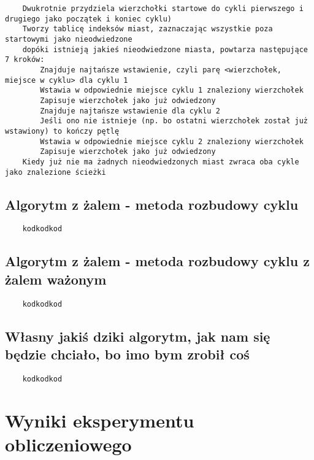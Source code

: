 \documentclass[11pt]{article}
\begin{document}
\begin{verbatim}
    Dwukrotnie przydziela wierzchołki startowe do cykli pierwszego i drugiego jako początek i koniec cyklu)
    Tworzy tablicę indeksów miast, zaznaczając wszystkie poza startowymi jako nieodwiedzone
    dopóki istnieją jakieś nieodwiedzone miasta, powtarza następujące 7 kroków:
        Znajduje najtańsze wstawienie, czyli parę <wierzchołek, miejsce w cyklu> dla cyklu 1
        Wstawia w odpowiednie miejsce cyklu 1 znaleziony wierzchołek
        Zapisuje wierzchołek jako już odwiedzony
        Znajduje najtańsze wstawienie dla cyklu 2
        Jeśli ono nie istnieje (np. bo ostatni wierzchołek został już wstawiony) to kończy pętlę
        Wstawia w odpowiednie miejsce cyklu 2 znaleziony wierzchołek
        Zapisuje wierzchołek jako już odwiedzony
    Kiedy już nie ma żadnych nieodwiedzonych miast zwraca oba cykle jako znalezione ścieżki

\end{verbatim}

\subsection{Algorytm z żalem - metoda rozbudowy cyklu}\label{subsec:algorytm-z-zalem---metoda-rozbudowy-cyklu}

\begin{verbatim}
    kodkodkod
\end{verbatim}

\subsection{Algorytm z żalem - metoda rozbudowy cyklu z żalem ważonym}\label{subsec:algorytm-z-zalem---metoda-rozbudowy-cyklu-z-zalem-wazonym}

\begin{verbatim}
    kodkodkod
\end{verbatim}

\subsection{Własny jakiś dziki algorytm, jak nam się będzie chciało, bo imo bym zrobił coś}

\begin{verbatim}
    kodkodkod
\end{verbatim}


\section{Wyniki eksperymentu obliczeniowego}\label{sec:wyniki-eksperymenty-obliczeniowego}
\end{document}
